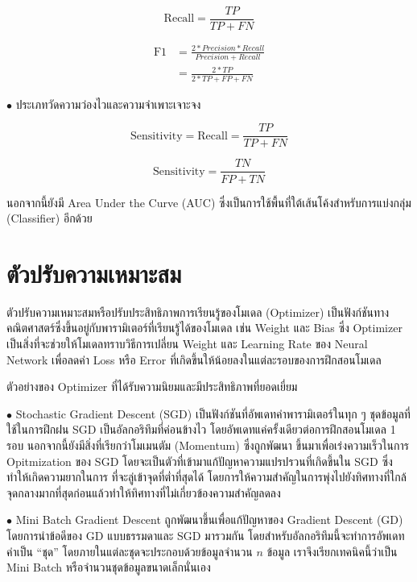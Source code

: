 \begin{equation}
    \text{Recall} = \frac{TP}{TP+FN}
\end{equation}

\begin{align}
    \text{F1} &= \frac{2*Precision*Recall}{Precision+Recall} \nonumber \\
    &= \frac{2*TP}{2*TP+FP+FN}
\end{align}

\noindent $\bullet$ ประเภทวัดความว่องไวและความจำเพาะเจาะจง

\begin{equation}
    \text{Sensitivity} = \text{Recall} = \frac{TP}{TP+FN}
\end{equation}

\begin{equation}
    \text{Sensitivity} = \frac{TN}{FP+TN}
\end{equation}

\noindent นอกจากนี้ยังมี Area Under the Curve (AUC) ซึ่งเป็นการใช้พื้นที่ใต้เส้นโค้งสำหรับการแบ่งกลุ่ม (Classifier) อีกด้วย

\section{ตัวปรับความเหมาะสม}
\label{sec:optimizer}

ตัวปรับความเหมาะสมหรือปรับประสิทธิภาพการเรียนรู้ของโมเดล (Optimizer) เป็นฟังก์ชันทางคณิตศาสตร์ซึ่งขึ้นอยู่กับพารามิเตอร์ที่เรียนรู้ได้ของโมเดล 
เช่น Weight และ Bias ซึ่ง Optimizer เป็นสิ่งที่จะช่วยให้โมเดลทราบวิธีการเปลี่ยน Weight และ Learning Rate ของ Neural Network 
เพื่อลดค่า Loss หรือ Error ที่เกิดขึ้นให้น้อยลงในแต่ละรอบของการฝึกสอนโมเดล

ตัวอย่างของ Optimizer ที่ได้รับความนิยมและมีประสิทธิภาพที่ยอดเยี่ยม

\noindent $\bullet$ Stochastic Gradient Descent (SGD) เป็นฟังก์ชันที่อัพเดทค่าพารามิเตอร์ในทุก ๆ ชุดข้อมูลที่ใช้ในการฝึกฝน SGD 
เป็นอัลกอริทึมที่ค่อนข้างไว โดยอัพเดทแค่ครั้งเดียวต่อการฝึกสอนโมเดล 1 รอบ นอกจากนี้ยังมีสิ่งที่เรียกว่าโมเมนตัม (Momentum) ซึ่งถูกพัฒนา%
ขึ้นมาเพื่อเร่งความเร็วในการ Opitmization ของ SGD โดยจะเป็นตัวที่เข้ามาแก้ปัญหาความแปรปรวนที่เกิดขึ้นใน SGD ซึ่งทำให้เกิดความยากในการ%
ที่จะลู่เข้าจุดที่ต่ำที่สุดได้ โดยการให้ความสำคัญในการพุ่งไปยังทิศทางที่ใกล้จุดกลางมากที่สุดก่อนแล้วทำให้ทิศทางที่ไม่เกี่ยวข้องความสำคัญลดลง

\noindent $\bullet$ Mini Batch Gradient Descent ถูกพัฒนาขึ้นเพื่อแก้ปัญหาของ Gradient Descent (GD) โดยการนำข้อดีของ GD 
แบบธรรมดาและ SGD มารวมกัน โดยสำหรับอัลกอริทึมนี้จะทำการอัพเดทค่าเป็น \enquote{ชุด} โดยภายในแต่ละชุดจะประกอบด้วยข้อมูลจำนวน 
$n$ ข้อมูล เราจึงเรียกเทคนิคนี้ว่าเป็น Mini Batch หรือจำนวนชุดข้อมูลขนาดเล็กนั่นเอง

